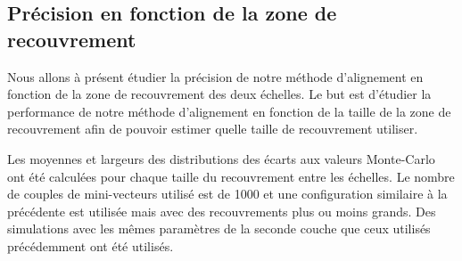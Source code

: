 % 
%   
  
%   
  
   \subsection{Pr\'ecision en fonction de la zone de recouvrement}
   
   Nous allons \`a pr\'esent \'etudier la pr\'ecision de notre m\'ethode d'alignement en fonction de la zone de recouvrement des deux \'echelles. Le but est d'\'etudier la performance de notre m\'ethode d'alignement en fonction de la taille de la zone de recouvrement afin de pouvoir estimer quelle taille de recouvrement utiliser. 
   
   \medskip
   
   Les moyennes et largeurs des distributions des \'ecarts aux valeurs Monte-Carlo ont \'et\'e calcul\'ees pour chaque taille du recouvrement entre les \'echelles. Le nombre de couples de mini-vecteurs utilis\'e est de 1000 et une configuration similaire \`a la pr\'ec\'edente est utilis\'ee mais avec des recouvrements plus ou moins grands. Des simulations avec les m\^emes param\`etres de la seconde couche que ceux utilis\'es pr\'ec\'edemment ont \'et\'e utilis\'es.
   
